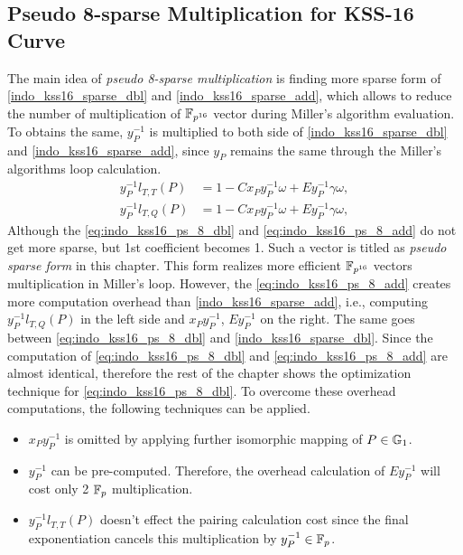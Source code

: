 \subsection{Pseudo 8-sparse Multiplication for KSS-16 Curve}
\label{sec:ch:indo:proposal_8sparse}
The main idea of  \textit{pseudo 8-sparse multiplication} is finding more sparse form  of \eqref{indo_kss16_sparse_dbl} and \eqref{indo_kss16_sparse_add}, which allows to reduce the number of multiplication of $\mathbb{F}_{p^{16}}$ vector during Miller's algorithm evaluation.  To obtains the same, $y_P^{-1}$ is multiplied to both side of  \eqref{indo_kss16_sparse_dbl} and \eqref{indo_kss16_sparse_add}, since $y_P$  remains the same through the Miller's algorithms loop calculation.
\begin{subequations}
	\begin{eqnarray}
	y_{P}^{-1}l_{T,T}(P)& =  1 -Cx_{P}y_{P}^{-1}\omega+E y_{P}^{-1}\gamma \omega,  \label{eq:indo_kss16_ps_8_dbl}\\
	y_{P}^{-1}l_{T,Q}(P)& =  1 -Cx_{P}y_{P}^{-1}\omega+E y_{P}^{-1}\gamma \omega, \label{eq:indo_kss16_ps_8_add}
	\end{eqnarray}
\end{subequations}
Although the \eqref{eq:indo_kss16_ps_8_dbl} and \eqref{eq:indo_kss16_ps_8_add} do not get more sparse, but 1st coefficient becomes 1. 
Such a vector is titled as \textit{pseudo sparse form} in this chapter. This form realizes more efficient $\mathbb{F}_{p^{16}}$ vectors multiplication in Miller's loop.  
However, the \eqref{eq:indo_kss16_ps_8_add} creates more computation overhead than \eqref{indo_kss16_sparse_add}, i.e., computing $y_{P}^{-1}l_{T,Q}(P)$ in the left side and $x_Py_{P}^{-1}$, $Ey_P^{-1}$ on the right. 
The same goes between \eqref{eq:indo_kss16_ps_8_dbl} and \eqref{indo_kss16_sparse_dbl}. 
Since the computation of \eqref{eq:indo_kss16_ps_8_dbl} and \eqref{eq:indo_kss16_ps_8_add} are almost identical, therefore the rest of the chapter shows the optimization technique for \eqref{eq:indo_kss16_ps_8_dbl}.
To overcome these overhead computations, the following techniques can be applied.
\begin{itemize}
	\item $x_{P}y_{P}^{-1}$ is omitted by applying further isomorphic mapping of $P \in {\mathbb{G}}_{1}$.
	\item  $y_P^{-1} $ can be pre-computed. Therefore, the overhead calculation of $Ey_P^{-1}$ will cost only 2 ${\mathbb{F}}_{p}$ multiplication.
	\item  $y_{P}^{-1}l_{T,T}(P)$  doesn't effect the pairing calculation cost since the final exponentiation cancels this multiplication by $y_{P}^{-1} \in {\mathbb{F}}_{p}$.
\end{itemize}

